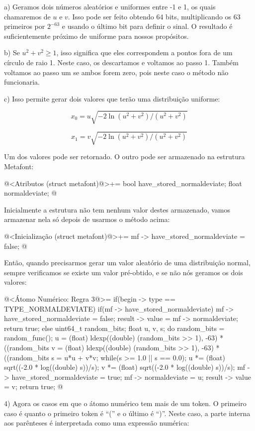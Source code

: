 a) Geramos dois números aleatórios e uniformes entre -1 e 1, os quais
chamaremos de $u$ e $v$. Isso pode ser feito obtendo 64 bits,
multiplicando os 63 primeiros por $2^{-63}$ e usando o último bit para
definir o sinal. O resultado é suficientemente próximo de uniforme
para nossos propósitos.

b) Se $u^2+v^2 \geq 1$, isso significa que eles correspondem a pontos
fora de um círculo de raio 1. Neste caso, os descartamos e voltamos ao
passo 1. Também voltamos ao passo um se ambos forem zero, pois neste
caso o método não funcionaria.

c) Isso permite gerar dois valores que terão uma distribuição
uniforme:

$$
x_0 = u\sqrt{-2\ln(u^2+v^2)/(u^2+v^2)}
$$

$$
x_1 = v\sqrt{-2\ln(u^2+v^2)/(u^2+v^2)}
$$

Um dos valores pode ser retornado. O outro pode ser armazenado na
estrutura Metafont:

\iniciocodigo
@<Atributos (struct metafont)@>+=
  bool have_stored_normaldeviate;
  float normaldeviate;
@
\fimcodigo

Inicialmente a estrutura não tem nenhum valor destes armazenado, vamos
armazenar nela só depois de usarmos o método acima:

\iniciocodigo
@<Inicialização (struct metafont)@>+=
mf -> have_stored_normaldeviate = false;
@
\fimcodigo

Então, quando precisarmos gerar um valor aleatório de uma distribuição
normal, sempre verificamos se existe um valor pré-obtido, e se não nós
geramos os dois valores:

\iniciocodigo
@<Átomo Numérico: Regra 3@>=
if(begin -> type == TYPE_NORMALDEVIATE){
  if(mf -> have_stored_normaldeviate){
    mf -> have_stored_normaldeviate = false;
    result -> value = mf -> normaldeviate;
    return true;
  }
  else{
    uint64_t random_bits;
    float u, v, s;
    do{
      random_bits = random_func();
      u = (float) ldexp((double) (random_bits >> 1), -63) *
            ((random_bits %
      v = (float) ldexp((double) (random_bits >> 1), -63) *
            ((random_bits %
      s = u*u + v*v;
    } while(s >= 1.0 || s == 0.0);
    u *= (float) sqrt((-2.0 * log((double) s))/s);
    v *= (float) sqrt((-2.0 * log((double) s))/s);
    mf -> have_stored_normaldeviate = true;
    mf -> normaldeviate = u;
    result -> value = v;
    return true;
  }
}
@
\fimcodigo

4) Agora os casos em que o átomo numérico tem mais de um token. O
primeiro caso é quanto o primeiro token é ``('' e o último é
``)''. Neste caso, a parte interna aos parênteses é interpretada como
uma expressão numérica:

